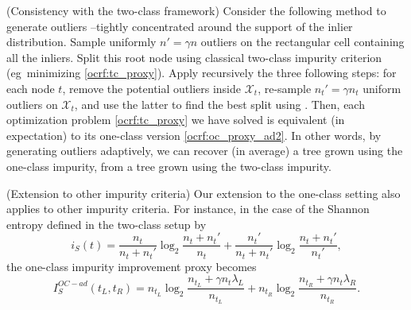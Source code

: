 \begin{remark}({Consistency with the two-class framework})
    Consider the following method to generate outliers --tightly concentrated
    around the support of the inlier distribution.
    Sample uniformly $n'= \gamma n$ outliers on the rectangular cell containing
    all the inliers. Split this root node using classical two-class impurity
    criterion (\acs{eg}~minimizing \cref{ocrf:tc_proxy}). Apply recursively the
    three following steps: for each node $t$, remove the potential outliers
    inside  $\mathcal{X}_t$, re-sample $n_t'=\gamma n_t$ uniform outliers on
    $\mathcal{X}_t$, and use the latter to find the best split using
    .
    Then, each optimization problem \cref{ocrf:tc_proxy} we have solved is
    equivalent (in expectation) to its one-class version
    \cref{ocrf:oc_proxy_ad2}. In other words, by generating outliers
    adaptively, we can recover (in average) a tree grown using the one-class
    impurity, from a tree grown using the two-class impurity.
\end{remark}

\begin{remark}({Extension to other impurity criteria})
    Our extension to the one-class setting also applies to other impurity
    criteria. For instance, in the case of the Shannon entropy defined in the
    two-class setup by
    \begin{dmath*}
        i_S(t) = \frac{n_t}{n_t + n_t'} \log_2 \frac{n_t + n_t'}{n_t} +
        \frac{n_t'}{n_t + n_t'} \log_2 \frac{n_t + n_t'}{n_t'},
    \end{dmath*}
    the one-class impurity improvement proxy becomes
    \begin{dmath*}
        I_S^{OC-ad}(t_L, t_R) = n_{t_L} \log_2 \frac{n_{t_L} + \gamma n_t
        \lambda_L}{n_{t_L}} + n_{t_R} \log_2 \frac{n_{t_R} + \gamma n_t
        \lambda_R}{n_{t_R}}.
    \end{dmath*}
\end{remark}
%
%
